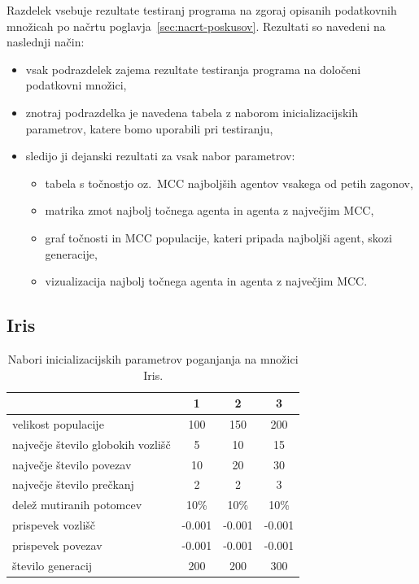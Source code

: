 Razdelek vsebuje rezultate testiranj programa na zgoraj opisanih podatkovnih množicah po načrtu poglavja~\ref{sec:nacrt-poskusov}.
Rezultati so navedeni na naslednji način:
\begin{itemize}
    \item vsak podrazdelek zajema rezultate testiranja programa na določeni podatkovni množici,
    \item znotraj podrazdelka je navedena tabela z naborom inicializacijskih parametrov, katere bomo uporabili pri testiranju,
    \item sledijo ji dejanski rezultati za vsak nabor parametrov:
    \begin{itemize}
        \item tabela s točnostjo oz.\ MCC najboljših agentov vsakega od petih zagonov,
        \item matrika zmot najbolj točnega agenta in agenta z največjim MCC,
        \item graf točnosti in MCC populacije, kateri pripada najboljši agent, skozi generacije,
        \item vizualizacija najbolj točnega agenta in agenta z največjim MCC.
    \end{itemize}
\end{itemize}

\subsection{Iris}\label{subsec:iris_test}
\begin{table}[H]
    \caption{Nabori inicializacijskih parametrov poganjanja na množici Iris.}
    \begin{center}
        \begin{tabular}{||l c c c||}
            \hline
            & 1      & 2      & 3 \\ [0.5ex]
            \hline
            velikost populacije               & 100    & 150    & 200    \\
            \hline
            največje število globokih vozlišč & 5      & 10     & 15     \\
            \hline
            največje število povezav          & 10     & 20     & 30     \\
            \hline
            največje število prečkanj         & 2      & 2      & 3      \\
            \hline
            delež mutiranih potomcev          & 10\%   & 10\%   & 10\%   \\
            \hline
            prispevek vozlišč                 & -0.001 & -0.001 & -0.001 \\
            \hline
            prispevek povezav                 & -0.001 & -0.001 & -0.001 \\
            \hline
            število generacij                 & 200    & 200    & 300    \\
            \hline
        \end{tabular}
    \end{center}
    \label{tab:param_iris}
\end{table}


